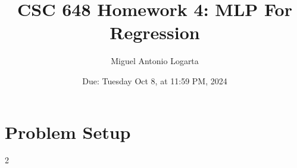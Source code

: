 \documentclass{article}
\title{CSC 648 Homework 4: MLP For Regression}
\date{Due: Tuesday Oct 8, at 11:59 PM, 2024}
\author{Miguel Antonio Logarta}
\begin{document}
\maketitle  %
\thispagestyle{fancy}

\section{Problem Setup}
2
\end{document}
